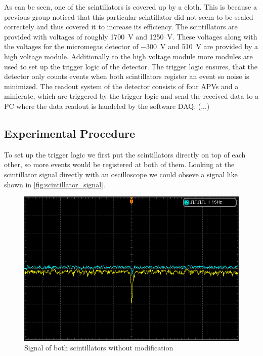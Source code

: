 \documentclass[sn-mathphys-num,iicol]{sn-jnl}
\theoremstyle{thmstyleone}
\theoremstyle{thmstyletwo}
\theoremstyle{thmstylethree}
\begin{document}
As can be seen, one of the scintillators is covered up by a cloth. This is because a previous group noticed that this particular scintillator did not seem to be sealed correctely and thus covered it to increase its efficiency.
The scintillators are provided with voltages of roughly \SI{1700}{\volt} and \SI{1250}{\volt}. These voltages along with the voltages for the micromegas detector of \SI{-300}{\volt} and \SI{510}{\volt} are provided by a high voltage module.
Additionally to the high voltage module more modules are used to set up the trigger logic of the detector.
The trigger logic ensures, that the detector only counts events when both scintillators register an event so noise is minimized.
The readout system of the detector consists of four APVs and a minicrate, which are triggered by the trigger logic and send the received data to a PC where the data readout is handeled by the software DAQ.
(...)

\subsection{Experimental Procedure}
To set up the trigger logic we first put the scintillators directly on top of each other, so more events would be registered at both of them.
Looking at the scintillator signal directly with an oscilloscope we could obseve a signal like shown in \autoref{fig:scintillator_signal}.

\begin{figure}
  \includegraphics[width=\linewidth]{figures/DS1Z_QuickPrint5_cropped.png}
  \caption{Signal of both scintillators without modification}
  \label{fig:scintillator_signal}
\end{figure}
\end{document}
